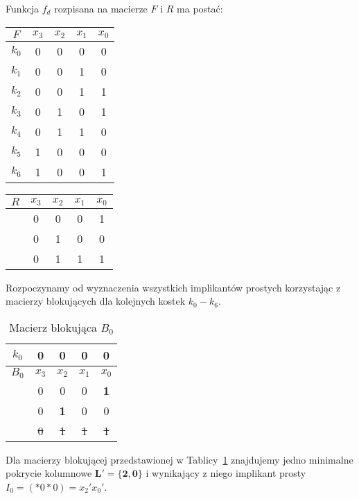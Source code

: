Funkcja $f_d$ rozpisana na macierze $F$ i $R$ ma postać:
    \begin{center}
        \begin{tabular}[t]{ |c|c c c c| }
            \hline
            $F$ & $x_3$ & $x_2$ & $x_1$ & $x_0$ \\
            \hline
            $k_0$ & 0 & 0 & 0 & 0 \\
            $k_1$ & 0 & 0 & 1 & 0 \\
            $k_2$ & 0 & 0 & 1 & 1 \\
            $k_3$ & 0 & 1 & 0 & 1 \\
            $k_4$ & 0 & 1 & 1 & 0 \\
            $k_5$ & 1 & 0 & 0 & 0 \\
            $k_6$ & 1 & 0 & 0 & 1 \\
            \hline
        \end{tabular}
        \hspace{1cm}
        \begin{tabular}[t]{ |c|c c c c| }
            \hline
            $R$ & $x_3$ & $x_2$ & $x_1$ & $x_0$ \\
            \hline
            & 0 & 0 & 0 & 1 \\
            & 0 & 1 & 0 & 0 \\
            & 0 & 1 & 1 & 1 \\
            \hline
        \end{tabular}
    \end{center}

    Rozpoczynamy od wyznaczenia wszystkich implikantów prostych korzystając z macierzy blokujących dla kolejnych kostek
    $k_0-k_6$.
    \begin{table}[H]
        \centering
        \begin{tabular}[t]{ |c|c c c c| }
            \hline
            $k_0$ & 0 & 0 & 0 & 0 \\
            \hline\hline
            $B_0$ & $x_3$ & $x_2$ & $x_1$ & $x_0$ \\
            \hline
            & 0 & 0 & 0 & \textbf{1} \\
            & 0 & \textbf{1} & 0 & 0 \\
            & \sout{0} & \sout{1} & \sout{1} & \sout{1} \\
            \hline
        \end{tabular}
        \caption{Macierz blokująca $B_0$} \label{tab:b0}
    \end{table}
    Dla macierzy blokującej przedstawionej w Tablicy~\ref{tab:b0} znajdujemy jedno minimalne pokrycie kolumnowe
    $\bm{L'=\{2,0\}}$ i wynikający z niego implikant prosty $I_0=(*0*0)=x_2'x_0'$.

